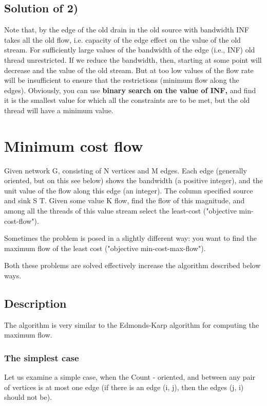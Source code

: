 \subsection{ Solution of 2) }
Note that, by the edge of the old drain in the old source with bandwidth INF takes all the old flow, i.e. capacity of the edge effect on the value of the old stream. For sufficiently large values ​​of the bandwidth of the edge (i.e., INF) old thread unrestricted. If we reduce the bandwidth, then, starting at some point will decrease and the value of the old stream. But at too low values ​​of the flow rate will be insufficient to ensure that the restrictions (minimum flow along the edges). Obviously, you can use \textbf{binary search on the value of INF,} and find it is the smallest value for which all the constraints are to be met, but the old thread will have a minimum value.

\section{ Minimum cost flow }
Given network G, consisting of N vertices and M edges. Each edge (generally oriented, but on this see below) shows the bandwidth (a positive integer), and the unit value of the flow along this edge (an integer). The column specified source and sink S T. Given some value K flow, find the flow of this magnitude, and among all the threads of this value stream select the least-cost ("objective min-cost-flow").

Sometimes the problem is posed in a slightly different way: you want to find the maximum flow of the least cost ("objective min-cost-max-flow").

Both these problems are solved effectively increase the algorithm described below ways.

\subsection{ Description }
The algorithm is very similar to the Edmonds-Karp algorithm for computing the maximum flow.

\subsubsection{ The simplest case }
Let us examine a simple case, when the Count - oriented, and between any pair of vertices is at most one edge (if there is an edge (i, j), then the edges (j, i) should not be).

